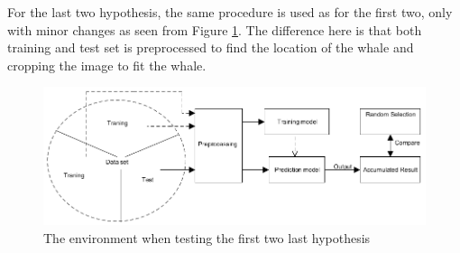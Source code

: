 For the last two hypothesis, the same procedure is used as for the first two, only with minor changes as seen from Figure \ref{fig:environmentPre}. The difference here is that both training and test set is preprocessed to find the location of the whale and cropping the image to fit the whale.

\begin{figure}
	\centering
	\includegraphics[width=\linewidth]{Images/EnvironmentWithPre}
	\caption{The environment when testing the first two last hypothesis}
	\label{fig:environmentPre}
\end{figure}